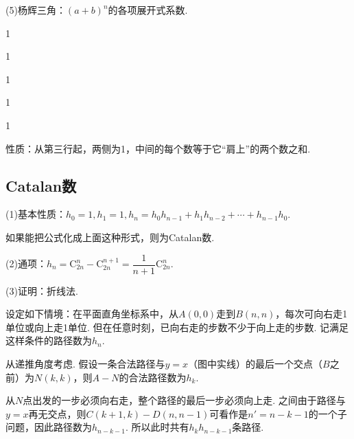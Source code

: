 \documentclass[a4paper]{article}
\def\byh{\!\!“}
\def\eyh{”\!\!}
\def\bkh{\!\!（}
\def\ekh{）\!\!}
\def\C{\mathrm{C}}
\def\dou{，\!\!}
\begin{document}
    (5)杨辉三角：\!\!${(a+b)}^n$的各项展开式系数.

    \begin{center}
        1

        1

        1

        1

        1
    \end{center}

    性质：\!\!从第三行起\dou 两侧为1\dou 中间的每个数等于它\byh 肩上\eyh 的两个数之和.

    \subsection{Catalan数}

    (1)基本性质：\!\!$h_0=1,h_1=1,h_n=h_0h_{n-1}+h_1h_{n-2}+\cdots+h_{n-1}h_0$.

    如果能把公式化成上面这种形式\dou 则为Catalan数.

    (2)通项：\!\!$h_n=\C_{2n}^n-\C_{2n}^{n+1}=\dfrac{1}{n+1}\C_{2n}^n$.

    (3)证明：\!\!折线法.

    设定如下情境：\!\!在平面直角坐标系中\dou 从$A(0,0)$走到$B(n,n)$\dou 每次可向右走1单位或向上走1单位. 但在任意时刻\dou 已向右走的步数不少于向上走的步数. 记满足这样条件的路径数为$h_n$.
    
    从递推角度考虑. 假设一条合法路径与$y=x$\bkh 图中实线\ekh 的最后一个交点\bkh $B$之前\ekh 为$N(k,k)$\dou 则$A-N$的合法路径数为$h_k$.

    \begin{center}
    \end{center}

    从$N$点出发的一步必须向右走\dou 整个路径的最后一步必须向上走. 之间由于路径与$y=x$再无交点\dou 则$C(k+1,k)-D(n,n-1)$可看作是$n'=n-k-1$的一个子问题\dou 因此路径数为$h_{n-k-1}$. 所以此时共有$h_kh_{n-k-1}$条路径.
    
\end{document}
